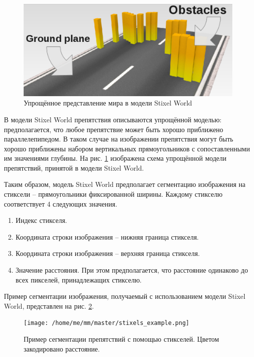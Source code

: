 \documentclass[aps,%
14pt,%
final,%
oneside,
onecolumn,%
musixtex, %
superscriptaddress,%
centertags]{extarticle} %
\begin{document}
\begin{figure}[htp]
\centering
\includegraphics[width=\textwidth]{stixels_basic.png}
\caption{Упрощённое представление мира в модели Stixel World \cite{benenson2011stixels}}
\label{stixels_basic}
\end{figure}

В модели Stixel World препятствия описываются упрощённой моделью: предполагается, что любое препятствие может быть хорошо приближено параллелепипедом. В таком случае на изображении препятствия могут быть хорошо приближены набором вертикальных прямоугольников с сопоставленными им значениями глубины. На рис. \ref{stixels_basic} изображена схема упрощённой модели препятствий, принятой в модели Stixel World.

Таким образом, модель Stixel World предполагает сегментацию изображения на стиксели -- прямоугольники фиксированной ширины. Каждому стикселю соответствует 4 следующих значения.
\begin{enumerate}
\item Индекс стикселя.
\item Координата строки изображения -- нижняя граница стикселя. 
\item Координата строки изображения -- верхняя граница стикселя.
\item Значение расстояния. При этом предполагается, что расстояние одинаково до всех пикселей, принадлежащих стикселю.
\end{enumerate}

Пример сегментации изображения, получаемый с использованием модели Stixel World, представлен на рис. \ref{stixels_segm}.

\begin{figure}[htp]
\centering
\texttt{[image: /home/me/mm/master/stixels\_example.png]}
\caption{Пример сегментации препятствий с помощью стикселей. Цветом закодировано расстояние.}
\label{stixels_segm}
\end{figure}
\end{document}
